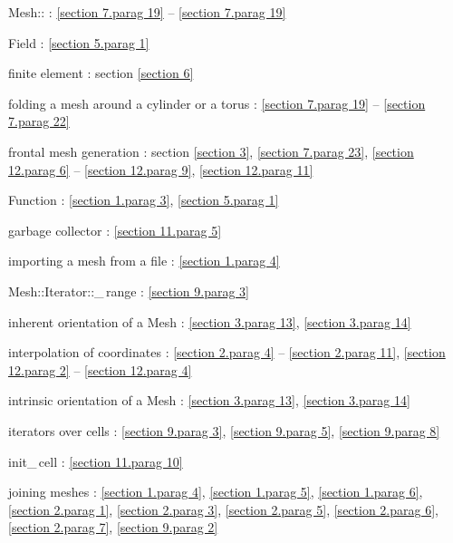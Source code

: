 \documentclass[a4paper,oneside]{scrbook}
\def\numb{}
\newcommand\verm[1]{\textcolor{manif}{#1}}
\renewcommand\tt{\normalfont\ttfamily}
\begin{document}
\noindent
{\small\tt\verm{Mesh}::} :
\ref{\numb section 7.\numb parag 19} -- \ref{\numb section 7.\numb parag 19}

\noindent
{\small\tt \verm{Field}} : \ref{\numb section 5.\numb parag 1}

\noindent
finite element : section \ref{\numb section 6}

\noindent
folding a mesh around a cylinder or a torus : \ref{\numb section 7.\numb parag 19} --
\ref{\numb section 7.\numb parag 22}

\noindent
frontal mesh generation : section \ref{\numb section 3}, \ref{\numb section 7.\numb parag 23},
\ref{\numb section 12.\numb parag 6} -- \ref{\numb section 12.\numb parag 9},
\ref{\numb section 12.\numb parag 11}

\noindent
{\small\tt \verm{Function}} : \ref{\numb section 1.\numb parag 3},
\ref{\numb section 5.\numb parag 1}

\noindent
garbage collector : \ref{\numb section 11.\numb parag 5}

\noindent
importing a mesh from a file : \ref{\numb section 1.\numb parag 4}

\noindent
{\small\tt\verm{Mesh}::Iterator::\_\,range} : \ref{\numb section 9.\numb parag 3}

\noindent
inherent orientation of a {\small\tt\verm{Mesh}} : \ref{\numb section 3.\numb parag 13},
\ref{\numb section 3.\numb parag 14}

\noindent
interpolation of coordinates :
\ref{\numb section 2.\numb parag 4} -- \ref{\numb section 2.\numb parag 11},
\ref{\numb section 12.\numb parag 2} -- \ref{\numb section 12.\numb parag 4}

\noindent
intrinsic orientation of a {\small\tt\verm{Mesh}} : \ref{\numb section 3.\numb parag 13},
\ref{\numb section 3.\numb parag 14}

\noindent
iterators over cells : \ref{\numb section 9.\numb parag 3}, \ref{\numb section 9.\numb parag 5},
\ref{\numb section 9.\numb parag 8}

\noindent
{\small\tt init\_\,cell} : \ref{\numb section 11.\numb parag 10}

\noindent
{\small\tt join}ing meshes : \ref{\numb section 1.\numb parag 4},
\ref{\numb section 1.\numb parag 5}, \ref{\numb section 1.\numb parag 6},
\ref{\numb section 2.\numb parag 1}, \ref{\numb section 2.\numb parag 3},
\ref{\numb section 2.\numb parag 5}, \ref{\numb section 2.\numb parag 6},
\ref{\numb section 2.\numb parag 7}, \ref{\numb section 9.\numb parag 2}
\end{document}
